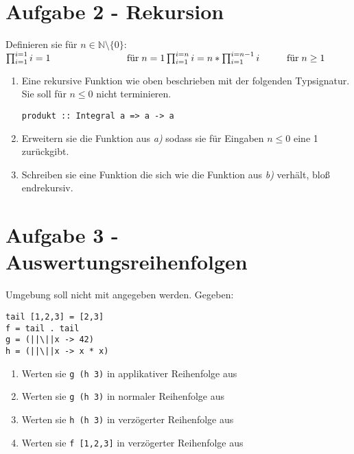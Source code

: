 \documentclass{article}
\begin{document}
\section*{Aufgabe 2 - Rekursion}
Definieren sie für $n \in \mathbb{N}\setminus\{0\}$: \\[2mm]
\begin{math}
    \prod_{i = 1}^{i = 1} i = 1 \hspace{28mm} \text{für} \; n=1 \\[2mm]
    \prod_{i = 1}^{i = n} i = n * \prod_{i = 1}^{i = n-1} i \hspace{10mm} \text{für} \; n\geq1 \\[2mm]
\end{math}
\begin{enumerate} [label={\alph*)}]
    \setlength\itemsep{3em}
    \item Eine rekursive Funktion wie oben beschrieben mit der folgenden Typsignatur. Sie soll für $n \leq 0$ nicht terminieren. \\
         \begin{verbatim}
produkt :: Integral a => a -> a
         \end{verbatim}

    \item Erweitern sie die Funktion aus \textit{a)} sodass sie für Eingaben $n \leq 0$ eine 1 zurückgibt.

    \item Schreiben sie eine Funktion die sich wie die Funktion aus \textit{b)} verhält, bloß endrekursiv.

\end{enumerate}

\newpage

\section*{Aufgabe 3 - Auswertungsreihenfolgen}
Umgebung soll nicht mit angegeben werden. Gegeben:
\begin{verbatim}
tail [1,2,3] = [2,3]
f = tail . tail
g = (||\||x -> 42)
h = (||\||x -> x * x)
\end{verbatim}

\begin{enumerate} [label={\alph*)}]
    \setlength\itemsep{3em}
    \item Werten sie \texttt{g (h 3)} in applikativer Reihenfolge aus \\

    \item Werten sie \texttt{g (h 3)} in normaler Reihenfolge aus \\

    \item Werten sie \texttt{h (h 3)} in verzögerter Reihenfolge aus \\

    \item Werten sie \texttt{f [1,2,3]} in verzögerter Reihenfolge aus \\
\end{enumerate}
\end{document}
